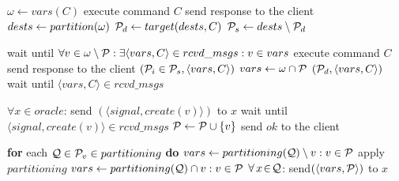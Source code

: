 \begin{algorithm}[h!]
\footnotesize

\begin{distribalgo}[1]

	\STATE $\omega \leftarrow vars(C)$
		\STATE execute command $C$
		\STATE send response to the client
		\STATE $dests \leftarrow partition(\omega)$
		\STATE $\mathcal{P}_d \leftarrow target(dests, C)$
		\STATE $\mathcal{P}_s \leftarrow dests \setminus \mathcal{P}_d$

			\STATE wait until $\forall v \in \omega \setminus \mathcal{P}: \exists \langle vars, C \rangle \in rcvd\_msgs :v \in vars$
			\STATE execute command $C$
			\STATE send response to the client
			\STATE \rmcast$(\mathcal{P}_i \in \mathcal{P}_s, \langle vars, C\rangle)$
			\STATE $vars \leftarrow \omega \cap \mathcal{P}$
			\STATE \rmcast$(\mathcal{P}_d, \langle vars, C \rangle)$
			\STATE wait until $\langle vars, C \rangle \in rcvd\_msgs$
		\ENDIF		
	\ENDIF
\ENDINDENT

\vspace{1.0mm}

\vspace{1.0mm}
	\STATE $\forall x \in oracle$: send $(\langle signal, create(v) \rangle )$ to $x$
	\STATE wait until $\langle signal, create(v) \rangle \in rcvd\_msgs$
	\STATE $\mathcal{P} \leftarrow \mathcal{P} \cup \{v\}$
	\STATE send $ok$ to the client
\ENDINDENT

\vspace{1.0mm}
	\STATE \textbf{for} each $\mathcal{Q} \in \mathcal{P}_v \in partitioning$ \textbf{do} 
			\STATE $vars \leftarrow partitioning(\mathcal{Q}) \setminus v:v \in \mathcal{P}$
				\STATE apply $partitioning$
			\ENDIF
		\ELSE 
			\STATE $vars \leftarrow partitioning(\mathcal{Q}) \cap v:v \in \mathcal{P}$
			\STATE $\forall\,x\!\in\!\mathcal{Q}$: send$(\langle vars, \mathcal{P} \rangle )$ to $x$
		\ENDIF
\ENDINDENT


\end{distribalgo}
\end{algorithm}

